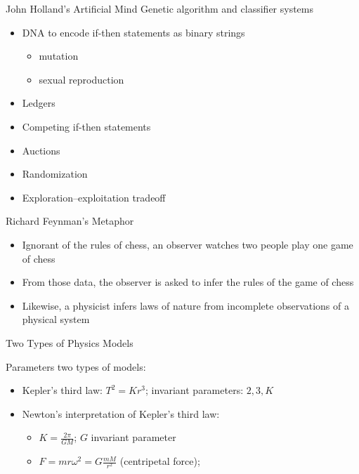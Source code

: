 \documentclass[aspectratio=169]{beamer}
\theoremstyle{Definition}
\begin{document}
\begin{frame}{John Holland's Artificial Mind}
Genetic algorithm and classifier systems

\begin{itemize}
\item DNA to encode if-then statements as binary strings
\begin{itemize}
\item mutation
\item  sexual reproduction
\end{itemize}
\item Ledgers
\item Competing if-then statements
\item Auctions
\item Randomization
\item Exploration--exploitation tradeoff


\end{itemize}


\end{frame}





\begin{frame}{Richard Feynman's Metaphor}

\begin{itemize}
\item Ignorant of the rules of chess, an observer watches  two people  play one game of chess
\item From those data, the observer is asked to infer the rules of the game of chess
\item Likewise,  a physicist infers laws of nature from incomplete observations of a physical system
\end{itemize}

\end{frame}


\begin{frame}{Two Types of Physics Models}

Parameters two types of  models:
\begin{itemize}
\item Kepler's third law: $T^2 = K r^3 $;  invariant parameters: $2, 3, K $ 
\item Newton's interpretation of Kepler's third law:
\begin{itemize}
\item  $K = \frac{2 \pi}{G M} $; $G$ invariant parameter
\item $F = m r \omega^2 = G \frac{m M}{r^2} $ (centripetal force); 
\end{itemize}  
\end{itemize}

\end{frame}
\end{document}
